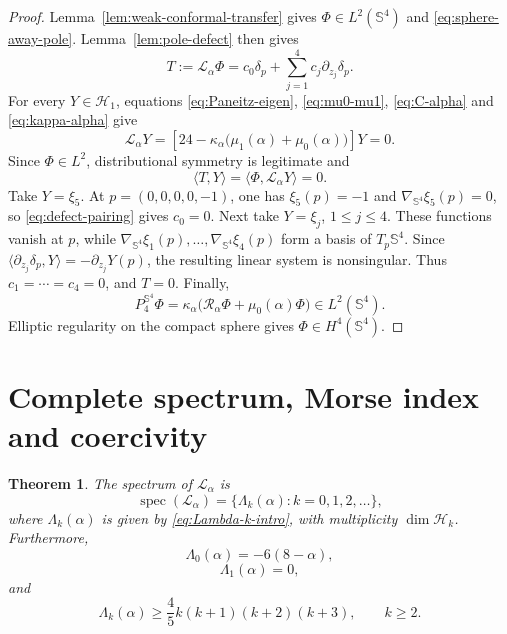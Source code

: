 \documentclass[11pt]{article}
\newtheorem{theorem}{Theorem}[section]
\numberwithin{equation}{section}
\begin{document}
\begin{proof}
Lemma~\ref{lem:weak-conformal-transfer} gives \(\Phi\in L^{2}(\mathbb S^{4})\)
and \eqref{eq:sphere-away-pole}. Lemma~\ref{lem:pole-defect} then gives
\[
T:=\mathcal L_{\alpha}\Phi
=c_{0}\delta_{p}+\sum_{j=1}^{4}c_{j}\partial_{z_{j}}\delta_{p}.
\]
For every \(Y\in\mathcal H_{1}\), equations \eqref{eq:Paneitz-eigen},
\eqref{eq:mu0-mu1}, \eqref{eq:C-alpha} and \eqref{eq:kappa-alpha} give
\[
\mathcal L_{\alpha}Y
=\left[24-\kappa_{\alpha}
\bigl(\mu_{1}(\alpha)+\mu_{0}(\alpha)\bigr)\right]Y=0.
\]
Since \(\Phi\in L^{2}\), distributional symmetry is legitimate and
\begin{equation}\label{eq:defect-pairing}
\langle T,Y\rangle
=\langle\Phi,\mathcal L_{\alpha}Y\rangle=0.
\end{equation}
Take \(Y=\xi_{5}\). At \(p=(0,0,0,0,-1)\), one has
\(\xi_{5}(p)=-1\) and \(\nabla_{\mathbb S^{4}}\xi_{5}(p)=0\), so
\eqref{eq:defect-pairing} gives \(c_{0}=0\). Next take
\(Y=\xi_{j}\), \(1\leq j\leq4\). These functions vanish at \(p\), while
\(\nabla_{\mathbb S^{4}}\xi_{1}(p),\ldots,
\nabla_{\mathbb S^{4}}\xi_{4}(p)\) form a basis of
\(T_{p}\mathbb S^{4}\). Since
\(\langle\partial_{z_j}\delta_p,Y\rangle=-\partial_{z_j}Y(p)\), the resulting
linear system is nonsingular. Thus \(c_{1}=\cdots=c_{4}=0\), and \(T=0\).
Finally,
\[
P_{4}^{\mathbb S^{4}}\Phi
=\kappa_{\alpha}
\bigl(\mathcal R_{\alpha}\Phi+\mu_{0}(\alpha)\Phi\bigr)
\in L^{2}(\mathbb S^{4}).
\]
Elliptic regularity on the compact sphere gives
\(\Phi\in H^{4}(\mathbb S^{4})\).
\end{proof}

\section{Complete spectrum, Morse index and coercivity}

\begin{theorem}\label{thm:spectrum-proof}
The spectrum of \(\mathcal L_{\alpha}\) is
\begin{equation*}
\operatorname{spec}(\mathcal L_{\alpha})
=\{\Lambda_{k}(\alpha):k=0,1,2,\ldots\},
\end{equation*}
where \(\Lambda_{k}(\alpha)\) is given by \eqref{eq:Lambda-k-intro}, with multiplicity \(\dim\mathcal H_{k}\). Furthermore,
\begin{equation*}
\Lambda_{0}(\alpha)=-6(8-\alpha),
\end{equation*}
\begin{equation}\label{eq:Lambda1}
\Lambda_{1}(\alpha)=0,
\end{equation}
and
\begin{equation}\label{eq:Lambda-high}
\Lambda_{k}(\alpha)
\geq\frac45 k(k+1)(k+2)(k+3),
\qquad k\geq2.
\end{equation}
\end{theorem}
\end{document}

